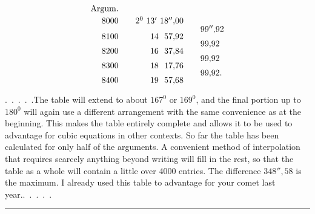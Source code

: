 \[
\renewcommand{\arraystretch}{.65}
\begin{array}{r@{\qquad}r@{\qquad}l}
\text{Argum.}&&\\[4pt]
8000&2^0\ 13'\ 18''{,}00&\\
&&99''{,}92\\
8100&14\ \ 57{,}92&\\
&&99{,}92\\
8200&16\ \ 37{,}84&\\
&&99{,}92\\
8300&18\ \ 17{,}76&\\
&&99{,}92.\\
8400&19\ \ 57{,}68&
\end{array}
\]
\par
{}
\noindent\hspace*{\parindent}.\ .\ .\ .\ .\quad The table will extend to about \(167^0\) or \(169^0\), and the final portion up to \(180^0\) will again use a different arrangement with the same convenience as at the beginning. This makes the table entirely complete and allows it to be used to advantage for cubic equations in other contexts. So far the table has been calculated for only half of the arguments. A convenient method of interpolation that requires scarcely anything beyond writing will fill in the rest, so that the table as a whole will contain a little over 4000 entries. The difference \(348''{,}58\) is the maximum. I already used this table to advantage for your comet last year.\quad .\ .\ .\ .\ .
\par\medskip
\begin{center}\rule{.22\textwidth}{.4pt}\end{center}
\endgroup
